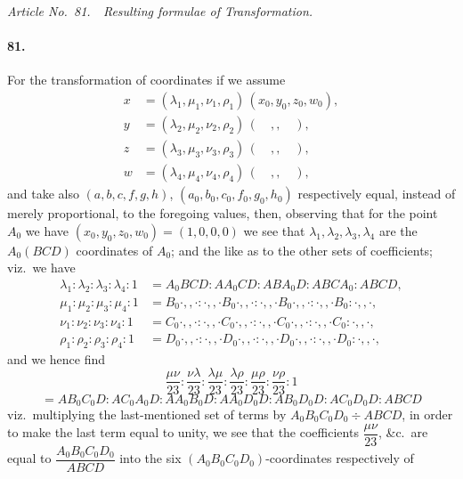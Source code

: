 \documentclass[11pt,a4paper]{article}
\begin{document}
\bigskip
\begin{center}
\textit{Article No.\ 81.\ \ Resulting formulae of Transformation.}
\end{center}

\paragraph{81.}
For the transformation of coordinates if we assume
\begin{align*}
x &= (\lambda_1, \mu_1, \nu_1, \rho_1)\,(x_0, y_0, z_0, w_0), \\
y &= (\lambda_2, \mu_2, \nu_2, \rho_2)\,(\quad,,\quad), \\
z &= (\lambda_3, \mu_3, \nu_3, \rho_3)\,(\quad,,\quad), \\
w &= (\lambda_4, \mu_4, \nu_4, \rho_4)\,(\quad,,\quad),
\end{align*}
and take also $(a,b,c,f,g,h)$, $(a_0, b_0, c_0, f_0, g_0, h_0)$ respectively equal, instead
of merely proportional, to the foregoing values, then, observing that for the point $A_0$
we have $(x_0, y_0, z_0, w_0) = (1, 0, 0, 0)$ we see that
$\lambda_1, \lambda_2, \lambda_3, \lambda_4$ are the $A_0 (BCD)$ coordinates of $A_0$; and the like
as to the other sets of coefficients; viz.\ we have
\begin{align*}
\lambda_1 : \lambda_2 : \lambda_3 : \lambda_4 : 1
 &= A_0 BCD : AA_0 CD : ABA_0 D : ABCA_0 : ABCD, \\
\mu_1 : \mu_2 : \mu_3 : \mu_4 : 1
 &= B_0 \cdot,, \cdot : \cdot,, \cdot B_0 \cdot,, \cdot : \cdot,, \cdot B_0 \cdot,, \cdot : \cdot,, \cdot B_0 : \cdot,, \cdot, \\
\nu_1 : \nu_2 : \nu_3 : \nu_4 : 1
 &= C_0 \cdot,, \cdot : \cdot,, \cdot C_0 \cdot,, \cdot : \cdot,, \cdot C_0 \cdot,, \cdot : \cdot,, \cdot C_0 : \cdot,, \cdot, \\
\rho_1 : \rho_2 : \rho_3 : \rho_4 : 1
 &= D_0 \cdot,, \cdot : \cdot,, \cdot D_0 \cdot,, \cdot : \cdot,, \cdot D_0 \cdot,, \cdot : \cdot,, \cdot D_0 : \cdot,, \cdot,
\end{align*}
and we hence find
\[
\frac{\mu\nu}{23} : \frac{\nu\lambda}{23} : \frac{\lambda\mu}{23}
 : \frac{\lambda\rho}{23} : \frac{\mu\rho}{23} : \frac{\nu\rho}{23} : 1
\]
\[
= A B_0 C_0 D : A C_0 A_0 D : A A_0 B_0 D : A A_0 D_0 D : A B_0 D_0 D : A C_0 D_0 D : ABCD
\]
viz.\ multiplying the last-mentioned set of terms by $A_0 B_0 C_0 D_0 \div ABCD$, in order to
make the last term equal to unity, we see that the coefficients $\dfrac{\mu\nu}{23}$, \&c.\ are
equal to $\dfrac{A_0 B_0 C_0 D_0}{ABCD}$ into the six $(A_0 B_0 C_0 D_0)$-coordinates respectively of
\end{document}

